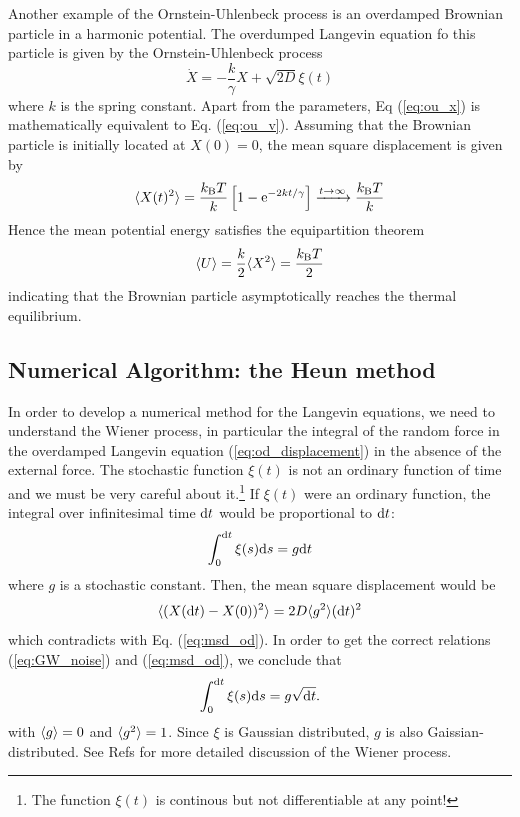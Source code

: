 Another example of the  Ornstein-Uhlenbeck process is an overdamped Brownian particle in a harmonic potential. The overdumped Langevin equation fo this particle is given by the  Ornstein-Uhlenbeck process
\begin{equation}\label{eq:ou_x}
\dot{X} = -\frac{k}{\gamma} X + \sqrt{2D} \xi(t)
\end{equation}
where $k$ is the spring constant.  Apart from the parameters, Eq (\ref{eq:ou_x}) is mathematically equivalent to Eq. (\ref{eq:ou_v}).
Assuming that  the Brownian particle is initially located at $X(0)=0$, the mean square displacement is given by
\begin{equation}
\langle X(t)^2 \rangle = \frac{k_\text{B} T}{k} \left [ 1 - \text{e}^{-2k t/\gamma} \right ] \xrightarrow{t \rightarrow \infty} \frac{k_\text{B} T}{k}
\end{equation}
Hence the mean potential energy satisfies the equipartition theorem\cite{equipartition}
\begin{equation}
\langle U \rangle = \frac{k}{2}\langle  X^2 \rangle = \frac{k_\text{B} T}{2}
\end{equation}
indicating that the Brownian particle asymptotically reaches the thermal equilibrium.

\subsection{Numerical Algorithm: the Heun method}

In order to develop a numerical method for the Langevin equations, we need to understand the Wiener process, in particular the integral of the random force in the overdamped Langevin equation (\ref{eq:od_displacement}) in the absence of the external force.  The stochastic function $\xi(t)$ is not an ordinary function of time and we must be very careful about it.\footnote{The function $\xi(t)$ is continous but not differentiable at any point!}  If $\xi(t)$ were an ordinary function, the integral over infinitesimal time $\text{d} t$ would be proportional to $\text{d} t$:
\begin{equation}
\int_0^{\text{d} t} \xi(s)\text{d} s = g \text{d} t
\end{equation}
where $g$ is a stochastic constant.
Then, the mean square displacement would be
\begin{equation}
\langle (X(\text{d} t)-X(0))^2 \rangle = 2D \langle g^2 \rangle (\text{d} t)^2
\end{equation}
which contradicts with Eq. (\ref{eq:msd_od}).  In order to get the correct relations (\ref{eq:GW_noise}) and (\ref{eq:msd_od}), we conclude that
\begin{equation}\label{eq:wiener}
\int_0^{\text{d} t} \xi(s)\text{d} s = g \sqrt{\text{d} t}.
\end{equation}
with $\langle g \rangle=0$ and $\langle g^2 \rangle=1$.  Since $\xi$ is Gaussian distributed, $g$ is also Gaissian-distributed.
See Refs \cite{langevin_eq_zwanzig,langevin_eq_sekimoto} for more detailed discussion of the Wiener process.

